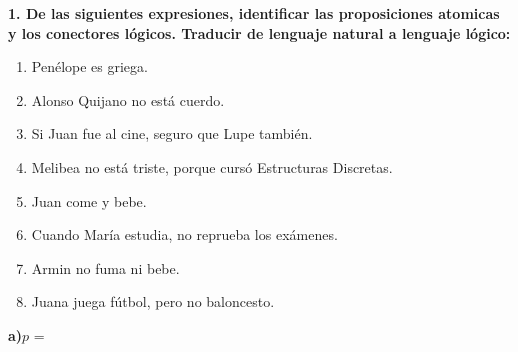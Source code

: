 \noindent\textbf{1. De las siguientes expresiones, identificar las proposiciones atomicas y los conectores lógicos. Traducir de lenguaje natural a lenguaje lógico:}

\begin{multicols}{2}
	\begin{enumerate}[label=\alph*)]
		\item Penélope es griega.
		\item Alonso Quijano no está cuerdo.
		\item Si Juan fue al cine, seguro que Lupe también.
		\item Melibea no está triste, porque cursó Estructuras Discretas.
		\item Juan come y bebe.
		\item Cuando María estudia, no reprueba los exámenes.
		\item Armin no fuma ni bebe.
		\item Juana juega fútbol, pero no baloncesto.
	\end{enumerate}
\end{multicols}

\textbf{a)}$p$ = 